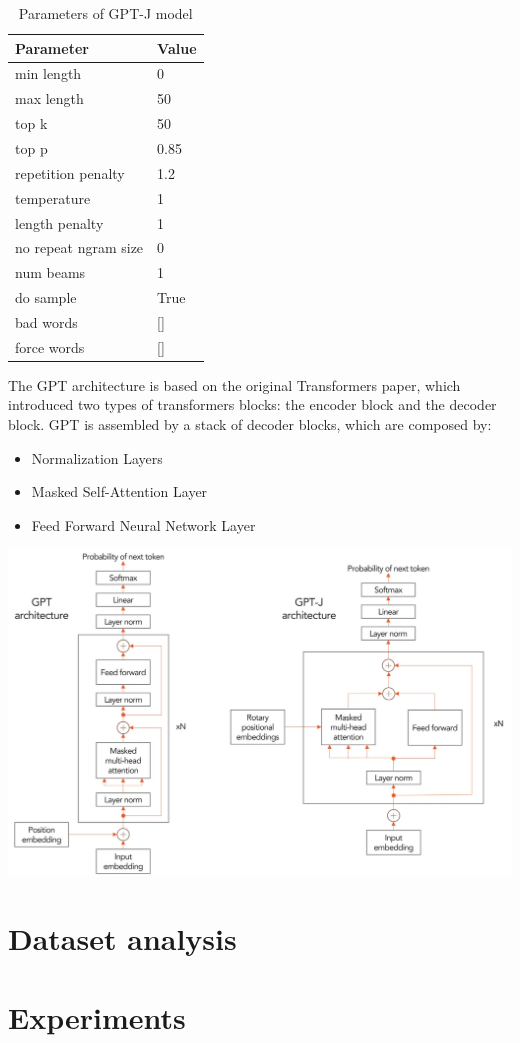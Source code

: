\documentclass{article}
\begin{document}
\begin{table}[h] 
\centering
\begin{tabular}{|l|l|}
\hline
Parameter          & Value \\ \hline
min length         & 0    \\ 
max length         & 50    \\ 
top k              & 50    \\
top p              & 0.85  \\
repetition penalty & 1.2   \\
temperature        & 1     \\
length penalty     & 1     \\
no repeat ngram size     & 0     \\
num beams &  1 \\
do sample & True \\
bad words & [\space] \\
force words & [\space] \\ \hline
\end{tabular}
\caption{Parameters of GPT-J model}\label{table:parametersGPTJTable}
\end{table}

The GPT architecture is based on the original Transformers paper, which introduced two types of transformers blocks: the encoder block and the decoder block. GPT is assembled by a stack of decoder blocks, which are composed by:
\begin{itemize}
    \item Normalization Layers
    \item Masked Self-Attention Layer
    \item Feed Forward Neural Network Layer
\end{itemize}



\includegraphics[width=\textwidth]{GPT-vs-GPT-J-uai-1440x933.jpg}


\section{Dataset analysis}


\section{Experiments}

    
\end{document}
